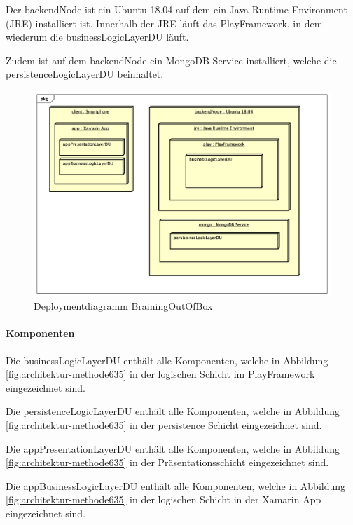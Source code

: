 Der backendNode ist ein Ubuntu 18.04 auf dem ein Java Runtime Environment (JRE) installiert ist. Innerhalb der JRE läuft das PlayFramework, in dem wiederum die businessLogicLayerDU läuft.

Zudem ist auf dem backendNode ein MongoDB Service installiert, welche  die persistenceLogicLayerDU beinhaltet.

\begin{figure}[h]
	\centering
	\includegraphics[width=1\linewidth]{img/deployment/DD_Methode635}
	\caption{Deploymentdiagramm BrainingOutOfBox}
	\label{fig:deployment-methode635}
\end{figure}

\paragraph*{Komponenten}

\begin{description}[leftmargin=!,labelwidth=\widthof{\bfseries appBusinessLogicLayerDU}]
	\item[businessLogicLayerDU] Die businessLogicLayerDU enthält alle Komponenten, welche in Abbildung \ref{fig:architektur-methode635} in der logischen Schicht im PlayFramework eingezeichnet sind.
	\item[persistenceLogicLayerDU] Die persistenceLogicLayerDU enthält alle Komponenten, welche in Abbildung \ref{fig:architektur-methode635} in der persistence Schicht eingezeichnet sind.
	\item[appPresentationLayerDU] Die appPresentationLayerDU enthält alle Komponenten, welche in Abbildung \ref{fig:architektur-methode635} in der Präsentationsschicht eingezeichnet sind.
	\item[appBusinessLogicLayerDU] Die appBusinessLogicLayerDU enthält alle Komponenten, welche in Abbildung \ref{fig:architektur-methode635} in der logischen Schicht in der Xamarin App eingezeichnet sind.
\end{description}
